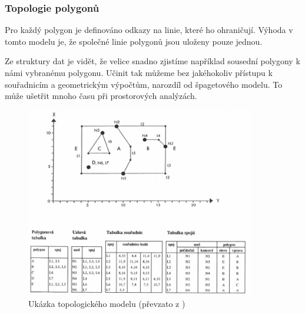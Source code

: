 \subsubsection{Topologie polygonů}
Pro každý polygon je definováno odkazy na linie, které ho
ohraničují. Výhoda v tomto modelu je, že společné linie polygonů jsou
uloženy pouze jednou.
	
Ze struktury dat je vidět, že velice snadno zjistíme například
sousední polygony k námi vybranému polygonu. Učinit tak můžeme bez
jakéhokoliv přístupu k souřadnicím a geometrickým výpočtům, narozdíl
od špagetového modelu. To může ušetřit mnoho času při prostorových
analýzách.

\begin{figure}[h]
  \centering
  \includegraphics[width=10cm]{./pictures/3/topo_model.png}
  \caption{Ukázka topologického modelu (převzato z \cite{kolar2003geograficke})}
  \label{fig:3-time_complexity}
\end{figure}
